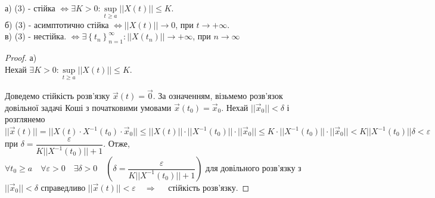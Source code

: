 \documentclass[14pt,a4paper]{scrartcl}
\theoremstyle{definition}
\theoremstyle{definition}
\theoremstyle{definition}
\begin{document}
\begin{spacing}{2.5}
  \begin{boxteo}\quad \\
  а) (3) - стійка $\Longleftrightarrow \exists K > 0: \sup\limits_{t\geq  a} ||X(t) || \leq K$.\\
  б) (3) - асимптотично стійка $\Longleftrightarrow  ||X(t)|| \to 0 $, при $ t \to +\infty$.\\
  в) (3) - нестійка. $ \Longleftrightarrow \exists \left\lbrace t_n \right\rbrace_{n=1}^{\infty} : ||X(t_n)|| \to +\infty $, при $n \to \infty$
  \end{boxteo}
\end{spacing}

\begin{spacing}{2.25}
\begin{proof}
а) \fbox{$\Longleftarrow$} \\ Нехай $ \exists K > 0 : \sup\limits_{t\geq a} ||X(t)|| \leq K$.

Доведемо стійкість розв'язку $\overrightarrow{x} (t) = \overrightarrow{0}.$ За означенням, візьмемо розв'язок довільної задачі Коші з початковими умовами $\overrightarrow{x } (t_0) = \overrightarrow{x}_0$.
Нехай $|| \overrightarrow{x}_0 || < \delta$ і розглянемо $ || \overrightarrow{x} (t)|| = || X(t) \cdot X^{-1} (t_0) \cdot \overrightarrow{x}_0 || \leq ||X(t)|| \cdot || X^{-1} (t_0)|| \cdot || \overrightarrow{x}_0|| \leq K \cdot || X^{-1} (t_0)|| \cdot || \overrightarrow{x}_0|| < K || X^{-1} (t_0)||\delta < \varepsilon $ при $ \delta = \dfrac{\varepsilon }{K || X^{-1} (t_0)|| + 1} $.
Отже, $\forall t_0 \geq  a \quad \forall \varepsilon >0 \quad \exists \delta > 0 \quad \left(  \delta = \dfrac{\varepsilon }{K || X^{-1} (t_0)|| + 1}  \right)$  для довільного розв'язку з $ || \overrightarrow{x}_0|| < \delta$ справедливо $ ||\overrightarrow{x} (t)|| < \varepsilon  \quad \Longrightarrow \quad $ стійкість розв'язку.
\end{proof}
\end{spacing}
\end{document}
